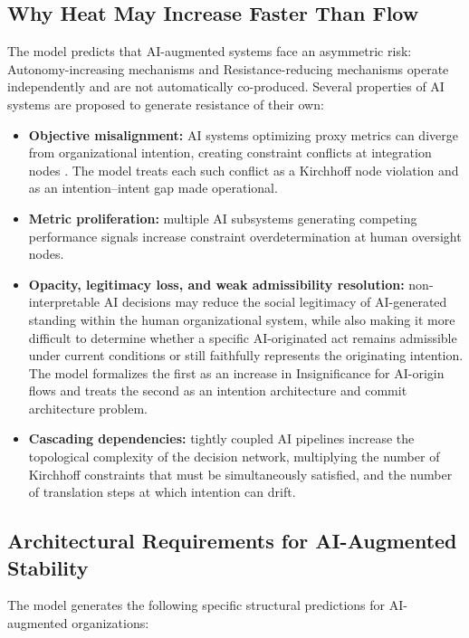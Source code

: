 \documentclass[12pt]{article}
\begin{document}
\subsection{Why Heat May Increase Faster Than Flow}

The model predicts that AI-augmented systems face an asymmetric risk:
Autonomy-increasing mechanisms and Resistance-reducing mechanisms
operate independently and are not automatically co-produced. Several
properties of AI systems are proposed to generate resistance of their own:

\begin{itemize}
  \item \textbf{Objective misalignment:} AI systems optimizing proxy
    metrics can diverge from organizational intention, creating constraint
    conflicts at integration nodes \citep{russell2019human}. The model
    treats each such conflict as a Kirchhoff node violation and as an
    intention--intent gap made operational.
  \item \textbf{Metric proliferation:} multiple AI subsystems generating
    competing performance signals increase constraint overdetermination
    at human oversight nodes.
  \item \textbf{Opacity, legitimacy loss, and weak admissibility resolution:}
    non-interpretable AI decisions may reduce the social legitimacy of
    AI-generated standing within the human organizational system, while also
    making it more difficult to determine whether a specific AI-originated
    act remains admissible under current conditions or still faithfully
    represents the originating intention. The model formalizes the first as
    an increase in Insignificance for AI-origin flows and treats the second
    as an intention architecture and commit architecture problem.
  \item \textbf{Cascading dependencies:} tightly coupled AI pipelines
    increase the topological complexity of the decision network, multiplying
    the number of Kirchhoff constraints that must be simultaneously satisfied,
    and the number of translation steps at which intention can drift.
\end{itemize}

\subsection{Architectural Requirements for AI-Augmented Stability}

The model generates the following specific structural predictions for
AI-augmented organizations:
\end{document}
